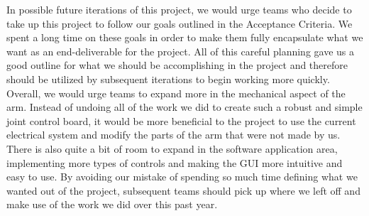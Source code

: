 \noindent In possible future iterations of this project, we would urge teams who decide to take up this project to follow our goals outlined in the Acceptance Criteria. We spent a long time on these goals in order to make them fully encapsulate what we want as an end-deliverable for the project.  All of this careful planning gave us a good outline for what we should be accomplishing in the project and therefore should be utilized by subsequent iterations to begin working more quickly. Overall, we would urge teams to expand more in the mechanical aspect of the arm. Instead of undoing all of the work we did to create such a robust and simple joint control board, it would be more beneficial to the project to use the current electrical system and modify the parts of the arm that were not made by us. There is also quite a bit of room to expand in the software application area, implementing more types of controls and making the GUI more intuitive and easy to use. By avoiding our mistake of spending so much time defining what we wanted out of the project, subsequent teams should pick up where we left off and make use of the work we did over this past year.  


